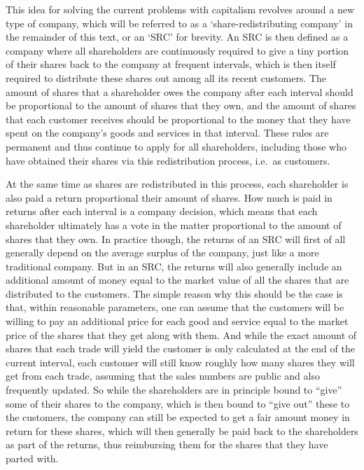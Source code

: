 \documentclass{article}
\begin{document}
This idea for solving the current problems with capitalism revolves around a new type of company, which will be referred to as a `share-redistributing company' in the remainder of this text, or an `SRC' for brevity.
An SRC is then defined as a company where all shareholders are continuously required to give a tiny portion of their shares back to the company at frequent intervals, which is then itself required to distribute these shares out among all its recent customers. The amount of shares that a shareholder owes the company after each interval should be proportional to the amount of shares that they own, and the amount of shares that each customer receives should be proportional to the money that they have spent on the company's goods and services in that interval. These rules are permanent and thus continue to apply for all shareholders, including those who have obtained their shares via this redistribution process, i.e.\ as customers.

At the same time as shares are redistributed in this process, each shareholder is also paid a return proportional their amount of shares. How much is paid in returns after each interval is a company decision, which means that each shareholder ultimately has a vote in the matter proportional to the amount of shares that they own. 
In practice though, the returns of an SRC will first of all generally depend on the average surplus of the company, just like a more traditional company. But in an SRC, the returns will also generally include an additional amount of money equal to the market value of all the shares that are distributed to the customers.
The simple reason why this should be the case is that, within reasonable parameters, one can assume that the customers will be willing to pay an additional price for each good and service equal to the market price of the shares that they get along with them. And while the exact amount of shares that each trade will yield the customer is only calculated at the end of the current interval, each customer will still know roughly how many shares they will get from each trade, assuming that the sales numbers are public and also frequently updated. 
So while the shareholders are in principle bound to ``give'' some of their shares to the company, which is then bound to ``give out'' these to the customers, the company can still be expected to get a fair amount money in return for these shares, which will then generally be paid back to the shareholders as part of the returns, thus reimbursing them for the shares that they have parted with. 
\end{document}
